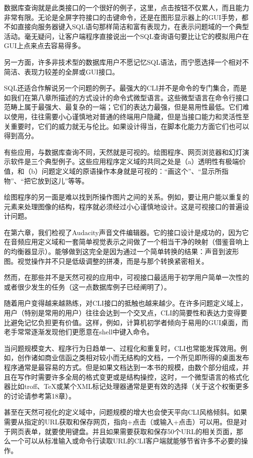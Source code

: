 \documentclass[12pt,oneside]{book}
\begin{document}
数据库查询就是此类接口的一个很好的例子，这里，点击按钮不仅累人，而且能力非常有限。无论是全屏字符接口的击键命令，还是在图形显示器上的GUI手势，都不如直接向服务器键入SQL语句那样简洁和富有表现力，在表示问题域的一个典型活动。毫无疑问，让客户端程序直接说出一个SQL查询语句要比让它的模拟用户在GUI上点来点去容易得多。

另一方面，许多非技术型的数据库用户不愿记忆SQL语法，而宁愿选择一个相对不简洁、表现力较差的全屏或GUI接口。

SQL还适合作解说另一个问题的例子。最强大的CLI并不是命令的专门集合，而是如我们在第八章所描述的方式设计的命令式微型语言。这些微型语言在命令行接口范畴上属于最强大、最复杂的一端；它们的表达力最强，但是易用性最低。它们难以使用，往往需要小心谨慎地对普通的终端用户隐藏，但是当接口能力和灵活性至关重要时，它们的威力就无与伦比。如果设计得当，在脚本化能力方面它们也可以得到高分。

有些应用，与数据库查询不同，天然就是可视的。绘图程序、网页浏览器和幻灯演示软件是三个典型例子。这些应用程序定义域的共同之处是（a）透明性有极端价值，和（b）问题定义域的原语操作本身就是可视的：“画这个”、“显示所指物”、“把它放到这儿”等等。

绘图程序的另一面是难以找到所操作图片之间的关系。例如，要让用户能以重复的元素来处理图像的结构，程序就必须经过小心谨慎地设计。这是可视接口的普遍设计问题。

在第六章，我们检视了Audacity声音文件编辑器。它的接口设计是成功的，因为它在音频应用定义域和一套简单视觉表示之间做了一个相当干净的映射（借鉴音响上的均衡器显示）。能够做到这完全是因为通过一个简单转换的结果：声音到波形图。视觉操作并不只是低级调整的拼凑，而是与那个转换紧密相关。

然而，在那些并不是天然可视的应用中，可视接口最适用于初学用户简单一次性的或者很少发生的任务（这一点数据库例子已经阐明了）。

随着用户变得越来越熟练，对CLI接口的抵触也越来越少。在许多问题定义域上，用户（特别是常用的用户）往往会达到一个交叉点，CLI的简要性和表达力变得要比避免记忆负担更有价值。这样，例如，计算机初学者倾向于易用的GUI桌面，而老手常常逐渐发现他们更愿意在shell中键入命令。

当问题规模变大、程序行为日趋单一、过程化和重复时，CLI也常能发挥效用。例如，创作诸如商业信函之类相对较小而无结构的文档，一个所见即所得的桌面发布程序通常是最容易的方式。但是如果文档达到一本书的规模，由数个部分组成，并且在写作时需要许多全局的格式变更或是结构操控，这时，一个微型语言的格式化器比如troff、TeX或某个XML标记处理器通常是更有效的选择（关于这个权衡更多的讨论请参考第18章）。

甚至在天然可视化的定义域中，问题规模的增大也会使天平向CLI风格倾斜。如果需要从指定的URL获取和保存网页，指向+点击（或输入+点击）可以用。但是对于网页表单，就要使用键盘。并且如果需要获取和保存50个URL的相关页面，那么一个可以从标准输入或命令行读取URL的CLI客户端就能够节省许多不必要的操作。
\end{document}
